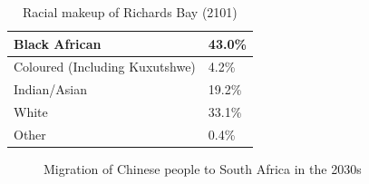 \begin{table}
\centering
\begin{tabular}{l|l}
Black African & 43.0\% \\
\hline
Coloured (Including Kuxutshwe) & 4.2\% \\
\hline
Indian/Asian & 19.2\% \\
\hline
White & 33.1\% \\
\hline
Other & 0.4\%
\end{tabular}
\caption{Racial makeup of Richards Bay (2101)}
\end{table}

\begin{figure}
\caption{Migration of Chinese people to South Africa in the 2030s}
\end{figure}